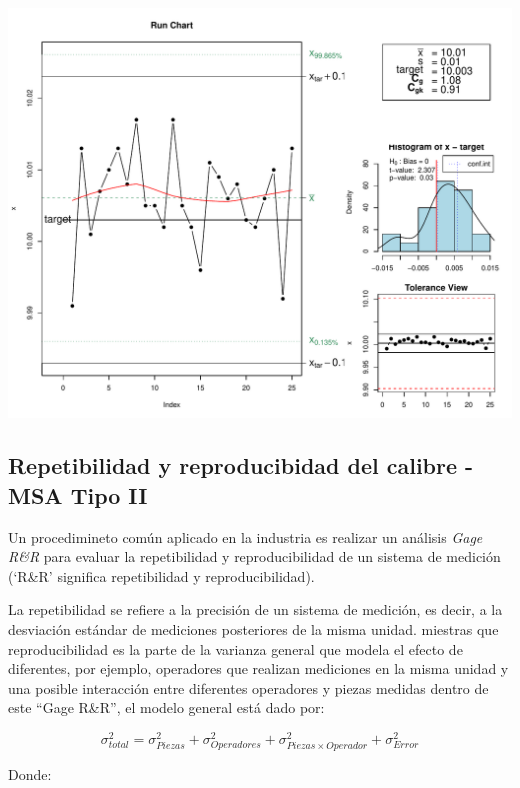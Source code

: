\documentclass[
]{book}
\begin{document}
\begin{center}\includegraphics{Libro_TidyQualityTools_files/figure-latex/unnamed-chunk-80-1} \end{center}

\hypertarget{repetibilidad-y-reproducibidad-del-calibre---msa-tipo-ii}{%
\subsection{Repetibilidad y reproducibidad del calibre - MSA Tipo II}\label{repetibilidad-y-reproducibidad-del-calibre---msa-tipo-ii}}

Un procedimineto común aplicado en la industria es realizar un análisis \emph{Gage R\&R} para evaluar la repetibilidad y reproducibilidad de un sistema de medición (`R\&R' significa repetibilidad y reproducibilidad).

La repetibilidad se refiere a la precisión de un sistema de medición, es decir, a la desviación estándar de mediciones posteriores de la misma unidad. miestras que reproducibilidad es la parte de la varianza general que modela el efecto de diferentes, por ejemplo, operadores que realizan mediciones en la misma unidad y una posible interacción entre diferentes operadores y piezas medidas dentro de este ``Gage R\&R'', el modelo general está dado por:

\[
\sigma^2_{total} = \sigma^2_{Piezas} + \sigma^2_{Operadores}  + \sigma^2_{Piezas \times Operador} + \sigma^2_{Error} 
\]

Donde:
\end{document}
